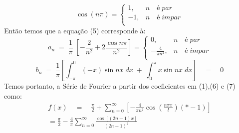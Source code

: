 \documentclass[12pt]{article}
\begin{document}
\begin{enumerate}[label=S.]
\begin{equation}
    \end{equation}
    \[
    \cos(n\pi)= 
    \begin{cases}
    1 , & n \quad é\;  par\\
    -1 , & n \quad é\;  impar\\
    \end{cases}
    \]
    Então temos que a equação (5) corresponde à:
	\begin{equation}
    a_{n} \;=\; \frac{1}{\pi} \; \left[ -\frac{2}{n^{2}} + 2 \frac{\cos n\pi}{n^{2}}\right]= 
    \begin{cases}
    0 , & n \quad é\;  par\\
    -\frac{4}{\pi n^{2}} , & n \quad é\;  impar\\
    \end{cases}
    \end{equation}
    \begin{equation}
    b_{n} \;=\; \frac{1}{\pi} \left[\int_{-\pi}^{0} (-x) \sin nx \;dx\;+\; \int_{0}^{\pi} x \sin nx\; dx\right] \quad=\quad 0
    \end{equation}
    Temos portanto, a Série de Fourier a partir dos coeficientes em (1),(6) e (7) como:
    \begin{equation}
    \begin{split}
    f(x) \quad=\quad \frac{\pi}{2} + \sum_{n=0}^{\infty}\left[ -\frac{4}{\pi n^{2}} \cos \left(\frac{n \pi x}{l}\right)(*-1)\right] \\= \frac{\pi}{2} - \frac{4}{\pi} \sum_{n=0}^{\infty} \frac{\cos[(2n+1)x]}{(2n+1)^{2}}
    \end{split}
    \end{equation}
   \end{enumerate}
\end{document}
